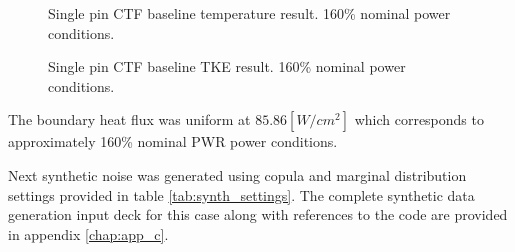\begin{figure}[H]%
    \centering
    \qquad
    \caption[Single pin CTF baseline temperature result.  160\% nominal power conditions.]{Single pin CTF baseline temperature result.  160\% nominal power conditions.}%
    \label{fig:ctf_twall_orig}%
\end{figure}

\begin{figure}[H]%
    \centering
    \qquad
    \caption[Single pin CTF baseline TKE result.  160\% nominal power conditions.]{Single pin CTF baseline TKE result.  160\% nominal power conditions.}%
    \label{fig:ctf_tke_orig}%
\end{figure}


The boundary heat flux was uniform at $85.86 [W/cm^2]$ which corresponds to approximately 160\% nominal PWR power conditions.

Next synthetic noise was generated using copula and marginal distribution settings provided in table \ref{tab:synth_settings}. The complete synthetic data generation input deck for this case along with references to the code are provided in appendix \ref{chap:app_c}.

